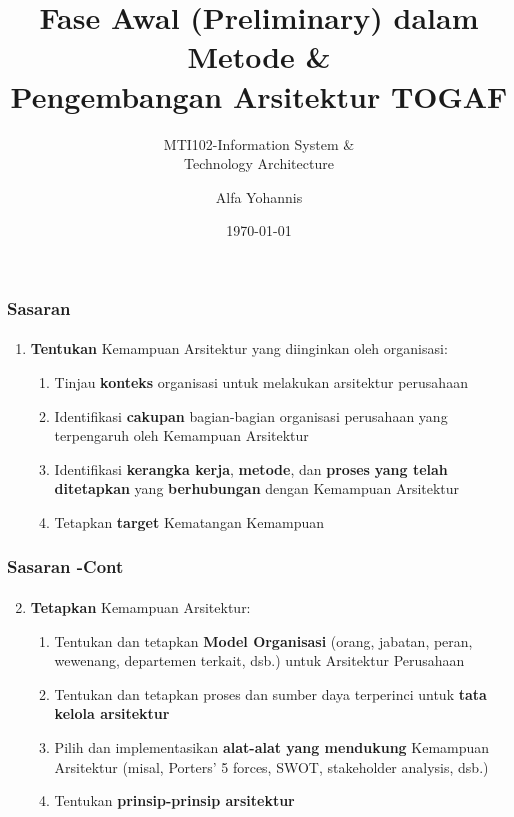 \documentclass[aspectratio=169, table]{beamer}
\subtitle{MTI102-Information System \&\\Technology Architecture}
\title{Fase Awal (Preliminary) dalam Metode \&\\ Pengembangan Arsitektur TOGAF}
\author{Alfa Yohannis}
\date{\today}
\begin{document}
	
	\frame{\titlepage}
	
	
	
	\begin{frame}
		\frametitle{Sasaran}
		\framesubtitle{\hspace{1cm}}
		\begin{enumerate}
			\item \textbf{Tentukan} Kemampuan Arsitektur yang diinginkan oleh organisasi:
			\begin{enumerate}
				\item Tinjau \textbf{konteks} organisasi untuk melakukan arsitektur perusahaan
				\item Identifikasi \textbf{cakupan} bagian-bagian organisasi perusahaan yang terpengaruh oleh Kemampuan Arsitektur
				\item Identifikasi \textbf{kerangka kerja}, \textbf{metode}, dan \textbf{proses} \textbf{yang telah ditetapkan} yang \textbf{berhubungan} dengan Kemampuan Arsitektur
				\item Tetapkan \textbf{target} Kematangan Kemampuan
			\end{enumerate}
		\end{enumerate}	
	\end{frame}
	
	\begin{frame}
		\frametitle{Sasaran -Cont}
		\framesubtitle{\hspace{1cm}}
		\begin{enumerate}
			\setcounter{enumi}{1}
			\item \textbf{Tetapkan} Kemampuan Arsitektur:
			\begin{enumerate}
				\item Tentukan dan tetapkan \textbf{Model Organisasi} (orang, jabatan, peran, wewenang, departemen terkait, dsb.) untuk Arsitektur Perusahaan
				\item Tentukan dan tetapkan proses dan sumber daya terperinci untuk \textbf{tata kelola arsitektur}
				\item Pilih dan implementasikan \textbf{alat-alat yang mendukung} Kemampuan Arsitektur (misal, Porters' 5 forces, SWOT, stakeholder analysis, dsb.)
				\item Tentukan \textbf{prinsip-prinsip arsitektur}
			\end{enumerate}
		\end{enumerate}
	\end{frame}
	
\end{document}
